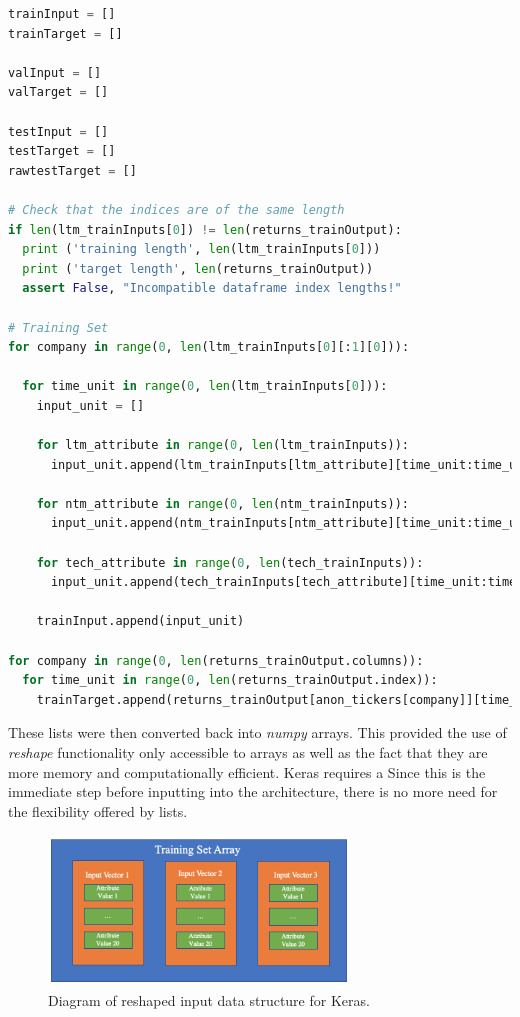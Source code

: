 \documentclass[10pt,onecolumn,letterpaper]{article}
\begin{document}
\begin{lstlisting}[language=Python, breaklines=true, caption={Formation of the input vectors for the model.}]
trainInput = []
trainTarget = []

valInput = []
valTarget = []

testInput = []
testTarget = []
rawtestTarget = []

# Check that the indices are of the same length 
if len(ltm_trainInputs[0]) != len(returns_trainOutput):
  print ('training length', len(ltm_trainInputs[0]))
  print ('target length', len(returns_trainOutput))
  assert False, "Incompatible dataframe index lengths!"

# Training Set
for company in range(0, len(ltm_trainInputs[0][:1][0])):
  
  for time_unit in range(0, len(ltm_trainInputs[0])): 
    input_unit = []
    
    for ltm_attribute in range(0, len(ltm_trainInputs)): 
      input_unit.append(ltm_trainInputs[ltm_attribute][time_unit:time_unit+1][0][company])
                        
    for ntm_attribute in range(0, len(ntm_trainInputs)):
      input_unit.append(ntm_trainInputs[ntm_attribute][time_unit:time_unit+1][0][company])
                        
    for tech_attribute in range(0, len(tech_trainInputs)): 
      input_unit.append(tech_trainInputs[tech_attribute][time_unit:time_unit+1][0][company])
                        
    trainInput.append(input_unit)
    
for company in range(0, len(returns_trainOutput.columns)):
  for time_unit in range(0, len(returns_trainOutput.index)): 
    trainTarget.append(returns_trainOutput[anon_tickers[company]][time_unit])
\end{lstlisting} 

These lists were then converted back into \textit{numpy} arrays. This provided the use of \textit{reshape} functionality only accessible to arrays as well as the fact that they are more memory and computationally efficient. Keras requires a Since this is the immediate step before inputting into the architecture, there is no more need for the flexibility offered by lists. 

\begin{figure}[!hbt!]
\centering
\includegraphics[width=8cm]{input_structure.png}
\caption{Diagram of reshaped input data structure for Keras.}
\end{figure}
\end{document}
